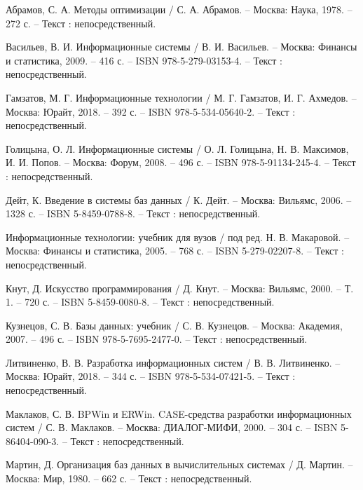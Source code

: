 
\begin{thebibliography}{9}

    Абрамов, С. А. Методы оптимизации / С. А. Абрамов. – Москва: Наука, 1978. – 272 с. – Текст : непосредственный.
    
    Васильев, В. И. Информационные системы / В. И. Васильев. – Москва: Финансы и статистика, 2009. – 416 с. – ISBN 978-5-279-03153-4. – Текст : непосредственный.
    
    Гамзатов, М. Г. Информационные технологии / М. Г. Гамзатов, И. Г. Ахмедов. – Москва: Юрайт, 2018. – 392 с. – ISBN 978-5-534-05640-2. – Текст : непосредственный.
    
    Голицына, О. Л. Информационные системы / О. Л. Голицына, Н. В. Максимов, И. И. Попов. – Москва: Форум, 2008. – 496 с. – ISBN 978-5-91134-245-4. – Текст : непосредственный.
    
    Дейт, К. Введение в системы баз данных / К. Дейт. – Москва: Вильямс, 2006. – 1328 с. – ISBN 5-8459-0788-8. – Текст : непосредственный.
    
    Информационные технологии: учебник для вузов / под ред. Н. В. Макаровой. – Москва: Финансы и статистика, 2005. – 768 с. – ISBN 5-279-02207-8. – Текст : непосредственный.
    
    Кнут, Д. Искусство программирования / Д. Кнут. – Москва: Вильямс, 2000. – Т. 1. – 720 с. – ISBN 5-8459-0080-8. – Текст : непосредственный.
    
    Кузнецов, С. В. Базы данных: учебник / С. В. Кузнецов. – Москва: Академия, 2007. – 496 с. – ISBN 978-5-7695-2477-0. – Текст : непосредственный.
    
    Литвиненко, В. В. Разработка информационных систем / В. В. Литвиненко. – Москва: Юрайт, 2018. – 344 с. – ISBN 978-5-534-07421-5. – Текст : непосредственный.
    
    Маклаков, С. В. BPWin и ERWin. CASE-средства разработки информационных систем / С. В. Маклаков. – Москва: ДИАЛОГ-МИФИ, 2000. – 304 с. – ISBN 5-86404-090-3. – Текст : непосредственный.
    
    Мартин, Д. Организация баз данных в вычислительных системах / Д. Мартин. – Москва: Мир, 1980. – 662 с. – Текст : непосредственный.
    

\end{thebibliography}
